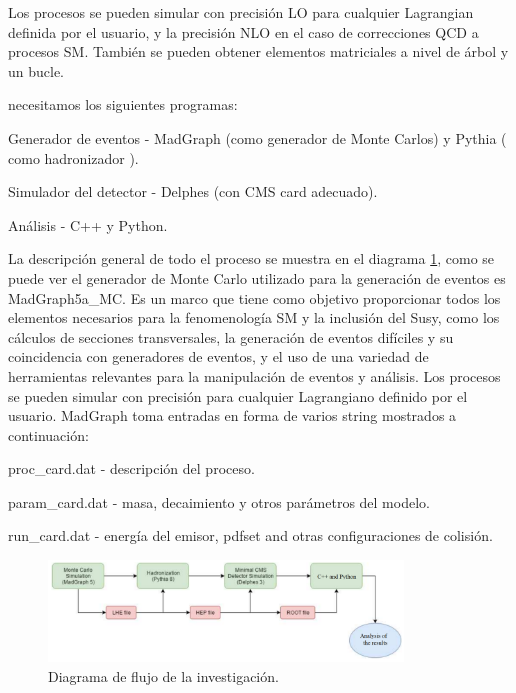 Los procesos se pueden simular con precisión LO para cualquier Lagrangian definida por el usuario, y la precisión NLO en el caso de correcciones QCD a procesos SM. También se pueden obtener elementos matriciales a nivel de árbol y un bucle.

necesitamos los siguientes programas:
\begin{itemize_f}
	\item  Generador de eventos - MadGraph (como generador de Monte Carlos) y Pythia ( como hadronizador ).
	\item  Simulador del detector - Delphes (con CMS card adecuado).
	\item  Análisis - C++ y Python.
\end{itemize_f}

La descripción general de todo el proceso se muestra en el diagrama \ref{fig:diagrama_workflow}, como se puede ver el generador de Monte Carlo utilizado para la generación de eventos es MadGraph5a\_MC. Es un marco que tiene como objetivo proporcionar todos los elementos necesarios para la fenomenología SM y la inclusión del Susy, como los cálculos de secciones transversales, la generación de eventos difíciles y su coincidencia con generadores de eventos, y el uso de una variedad de herramientas relevantes para la manipulación de eventos y análisis. Los procesos se pueden simular con precisión para cualquier Lagrangiano definido por el usuario. MadGraph toma entradas en forma de varios string mostrados a continuación:
\begin{itemize_f}
	\item  proc\_card.dat - descripción del proceso.
	\item  param\_card.dat - masa, decaimiento y otros parámetros del modelo.
	\item  run\_card.dat - energía del emisor, pdfset and otras configuraciones de colisión.
\end{itemize_f}

\begin{figure}[h!]
    \centering
    \includegraphics[width=0.84\textwidth]{Analisis_y_Resultados/imagenes/diagrama_workflow.png}
    \caption{Diagrama de flujo de la investigación.}
    \label{fig:diagrama_workflow}
\end{figure}

